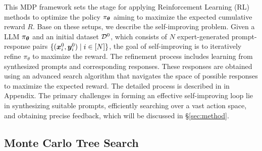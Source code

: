 This MDP framework sets the stage for applying Reinforcement Learning (RL) methods to optimize the policy $\pi_{\bm{\theta}}$ aiming to maximize the expected cumulative reward $R$. Base on these setups, we describe the self-improving problem. Given a LLM $\pi_{\bm{\theta}}$ and an initial dataset ${\mathcal{D}}^0$, which consists of $N$ expert-generated prompt-response pairs $\{({\bm{x}}_i^0, {\bm{y}}_i^0) \mid i \in [N]\}$, the goal of self-improving is to iteratively refine $\pi_\theta$ to maximize the reward. The refinement process includes learning from synthesized prompts and corresponding responses. These responses are obtained using an advanced search algorithm that navigates the space of possible responses to maximize the expected reward. The detailed process is described in  in Appendix. The primary challenges in forming an effective self-improving loop lie in synthesizing suitable prompts, efficiently searching over a vast action space, and obtaining precise feedback, which will be discussed in \S \ref{sec:method}.





\subsection{Monte Carlo Tree Search}

